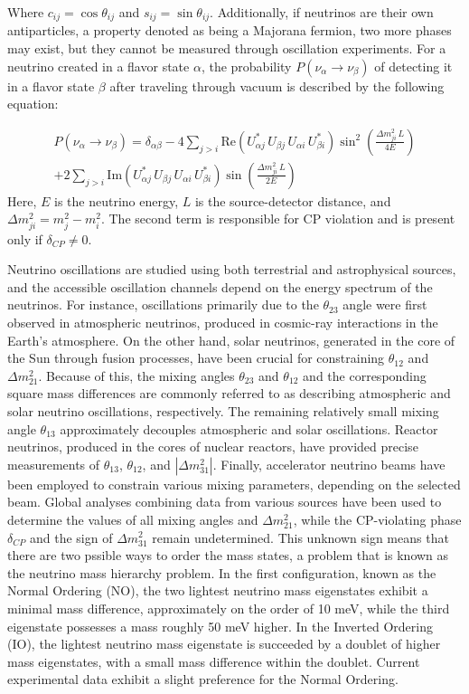 Where $c_{ij} = \cos\theta_{ij}$ and $s_{ij} = \sin\theta_{ij}$. Additionally, if neutrinos are their own antiparticles,
a property denoted as being a Majorana fermion, two more phases may exist, but they cannot be measured through
oscillation experiments. For a neutrino created in a flavor state $\alpha$, the probability $P(\nu_\alpha \rightarrow
\nu_\beta)$ of detecting it in a flavor state $\beta$ after traveling through vacuum is described by the following equation:

\begin{eqnarray}
      P({\nu_\alpha \rightarrow\nu_\beta}) = \delta_{\alpha\beta} - 4\sum_{j > i}\mathrm{Re}\left(U_{\alpha j}^*\,U_{\beta j}\,
      U_{\alpha i}\,U_{\beta i}^*\right)\sin^2\left(\frac{\Delta m^2_{ji}\,L}{4E}\right) \\ 
      + 2\sum_{j > i}\mathrm{Im}
      \left(U_{\alpha j}^*\,U_{\beta j}\,U_{\alpha i}\,U_{\beta i}^*\right)\sin\left(\frac{\Delta m^2_{ji}\,L}{2E}
      \right) \nonumber
\end{eqnarray}
Here, $E$ is the neutrino energy, $L$ is the source-detector distance, and $\Delta m^2_{ji} = m_j^2 - m_i^2$. The
second term is responsible for CP violation and is present only if $\delta_{CP}\neq 0$.

Neutrino oscillations are studied using both terrestrial and astrophysical sources, and the accessible
oscillation channels depend on the energy spectrum of the neutrinos. For instance, oscillations primarily due to the
$\theta_{23}$ angle were first observed in atmospheric neutrinos, produced in
cosmic-ray interactions in the Earth's atmosphere. On the other hand, solar neutrinos, generated in the core of the Sun through fusion processes, have been crucial for
constraining $\theta_{12}$ and $\Delta m^2_{21}$. 
Because of this, the mixing angles $\theta_{23}$ and $\theta_{12}$ and the corresponding square mass differences are
commonly referred to as describing atmospheric and solar neutrino oscillations, respectively. The remaining relatively small mixing angle $\theta_{13}$ approximately decouples atmospheric and solar oscillations. 
Reactor neutrinos, produced in the cores of nuclear reactors, have provided precise measurements of $\theta_{13}$,
$\theta_{12}$, and $|\Delta m^2_{31}|$. Finally, accelerator neutrino beams have been employed to constrain various mixing
parameters, depending on the selected beam. Global analyses combining data from various sources have
been used to determine the values of all mixing angles and $\Delta m^2_{21}$, while the CP-violating phase $\delta_{CP}$ and the sign of $\Delta m^2_{31}$ remain undetermined.
This unknown sign means that there are two pssible ways to order the mass states, a problem that is known as the
neutrino mass hierarchy problem. 
In the first configuration, known as the Normal Ordering (NO), the two lightest neutrino mass
eigenstates exhibit a minimal mass difference, approximately on the order of 10 meV, while the third eigenstate
possesses a mass roughly 50 meV higher. In the Inverted Ordering (IO), the lightest neutrino mass eigenstate is
succeeded by a doublet of higher mass eigenstates, with a small mass difference within the doublet. Current experimental
data exhibit a slight preference for the Normal Ordering.


